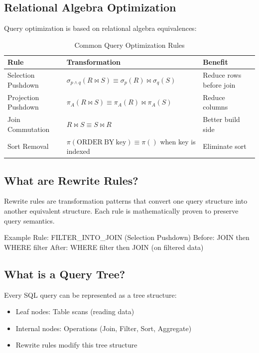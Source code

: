 \documentclass[12pt,a4paper]{article}
\begin{document}
\subsection{Relational Algebra Optimization}
Query optimization is based on relational algebra equivalences:

\begin{table}[h]
\centering
\small
\begin{tabularx}{\textwidth}{|l|X|l|}
\hline
\textbf{Rule} & \textbf{Transformation} & \textbf{Benefit} \\
\hline
Selection Pushdown &
$\sigma_{p\land q}(R\bowtie S)\equiv
\sigma_p(R)\bowtie\sigma_q(S)$ &
Reduce rows before join \\
\hline

Projection Pushdown &
$\pi_A(R\bowtie S)\equiv
\pi_A(R)\bowtie\pi_A(S)$ &
Reduce columns \\
\hline

Join Commutation &
$R\bowtie S\equiv S\bowtie R$ &
Better build side \\
\hline

Sort Removal &
$\pi(\mathrm{ORDER\ BY\ key})
\equiv \pi()$ when key is indexed &
Eliminate sort \\
\hline
\end{tabularx}
\caption{Common Query Optimization Rules}
\end{table}

\subsection{What are Rewrite Rules?}
Rewrite rules are transformation patterns that convert one query structure into another equivalent structure. Each rule is mathematically proven to preserve query semantics.

Example Rule: FILTER\_INTO\_JOIN (Selection Pushdown)
Before: JOIN then WHERE filter
After: WHERE filter then JOIN (on filtered data)

\subsection{What is a Query Tree?}
Every SQL query can be represented as a tree structure:
\begin{itemize}
    \item Leaf nodes: Table scans (reading data)
    \item Internal nodes: Operations (Join, Filter, Sort, Aggregate)
    \item Rewrite rules modify this tree structure
\end{itemize}
\end{document}
